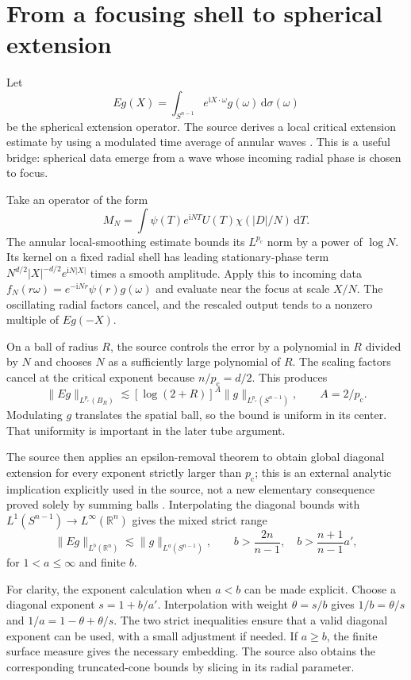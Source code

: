 \documentclass[11pt,a4paper]{article}
\numberwithin{equation}{section}
\theoremstyle{definition}
\theoremstyle{remark}
\newcommand{\R}{\mathbb R}
\newcommand{\dd}{\,\mathrm d}
\newcommand{\pc}{p_{\mathrm c}}
\begin{document}
\section{From a focusing shell to spherical extension}
\label{sec:restriction}
Let
\[
 Eg(X)=\int_{S^{n-1}}e^{\mathrm iX\cdot\omega}g(\omega)\dd\sigma(\omega)
\]
be the spherical extension operator. The source derives a local critical
extension estimate by using a modulated time average of annular waves
\cite{kakeya-proof}. This is a useful bridge: spherical data emerge from a
wave whose incoming radial phase is chosen to focus.

Take an operator of the form
\[
 M_N=\int\psi(T)e^{\mathrm iNT}U(T)\chi(|D|/N)\dd T.
\]
The annular local-smoothing estimate bounds its $L^{\pc}$ norm by a power of
$\log N$. Its kernel on a fixed radial shell has leading stationary-phase
term $N^{d/2}|X|^{-d/2}e^{\mathrm iN|X|}$ times a smooth amplitude.
Apply this to incoming data
$f_N(r\omega)=e^{-\mathrm iNr}\psi(r)g(\omega)$ and evaluate near the focus
at scale $X/N$. The oscillating radial factors cancel, and the rescaled
output tends to a nonzero multiple of $Eg(-X)$.

On a ball of radius $R$, the source controls the error by a polynomial in
$R$ divided by $N$ and chooses $N$ as a sufficiently large polynomial of $R$.
The scaling factors cancel at the critical exponent because
$n/\pc=d/2$. This produces
\begin{equation}\label{eq:localextension}
 \|Eg\|_{L^{\pc}(B_R)}\lesssim
 [\log(2+R)]^{A}\|g\|_{L^{\pc}(S^{n-1})},\qquad A=2/\pc.
\end{equation}
Modulating $g$ translates the spatial ball, so the bound is uniform in its
center. That uniformity is important in the later tube argument.

The source then applies an epsilon-removal theorem to obtain global diagonal
extension for every exponent strictly larger than $\pc$; this is an external
analytic implication explicitly used in the source, not a new elementary
consequence proved solely by summing balls \cite{global-extension}.
Interpolating the diagonal bounds with $L^1(S^{n-1})\to L^\infty(\R^n)$
gives the mixed strict range
\begin{equation}\label{eq:restrictionrange}
 \|Eg\|_{L^b(\R^n)}\lesssim\|g\|_{L^a(S^{n-1})},\qquad
 b>\frac{2n}{n-1},\quad
 b>\frac{n+1}{n-1}a',
\end{equation}
for $1<a\le\infty$ and finite $b$.

For clarity, the exponent calculation when $a<b$ can be made explicit.
Choose a diagonal exponent $s=1+b/a'$. Interpolation with weight $\theta=s/b$
gives $1/b=\theta/s$ and $1/a=1-\theta+\theta/s$.
The two strict inequalities ensure that a valid diagonal exponent can be
used, with a small adjustment if needed. If $a\ge b$, the finite surface
measure gives the necessary embedding. The source also obtains the
corresponding truncated-cone bounds by slicing in its radial parameter.
\end{document}
